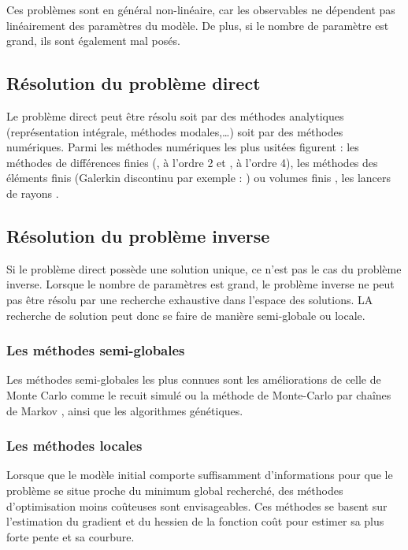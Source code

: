 Ces problèmes sont en général non-linéaire, car les observables ne dépendent pas linéairement des paramètres du modèle. De plus, si le nombre de paramètre est grand, ils sont également mal posés.\\

\subsection{Résolution du problème direct}

Le problème direct peut être résolu soit par des méthodes analytiques (représentation intégrale, méthodes modales,\ldots) soit par des méthodes numériques. Parmi les méthodes numériques les plus usitées figurent : les méthodes de différences finies (\citealp{virieux_86}, à l'ordre 2 et \citealp{levander}, à l'ordre 4), les méthodes des éléments finis (Galerkin discontinu par exemple : \citealp{brossier_these}) ou volumes finis \citep{brossier_2008}, les lancers de rayons \citep{virieux_ray}. 

\subsection{Résolution du problème inverse}
Si le problème direct possède une solution unique, ce n'est pas le cas du problème inverse.
Lorsque le nombre de paramètres est grand, le problème inverse ne peut pas être résolu par une recherche exhaustive dans l'espace des solutions. LA recherche de solution peut donc se faire de manière semi-globale ou locale.\\

\subsubsection{Les méthodes semi-globales}
Les méthodes semi-globales les plus connues sont les améliorations de celle de Monte Carlo comme le recuit simulé \citep{tarantola_book, sen} ou  la méthode de Monte-Carlo par chaînes de Markov \citep{zhang}, ainsi que les algorithmes génétiques.\\

\subsubsection{Les méthodes locales}
Lorsque que le modèle initial comporte suffisamment d'informations pour que le problème se situe proche du minimum global recherché, des méthodes d'optimisation moins coûteuses sont envisageables. Ces méthodes se basent sur l'estimation du gradient et du hessien de la fonction coût pour estimer sa plus forte pente et sa courbure.\\

